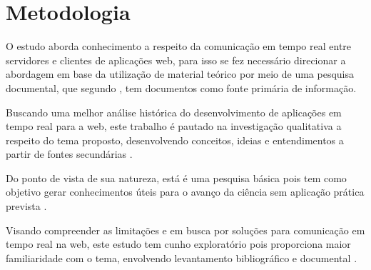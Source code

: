 \section{Metodologia}

O estudo aborda conhecimento a respeito da comunicação em tempo real entre servidores e clientes de aplicações web, para isso se fez necessário direcionar a abordagem em base da utilização de material teórico por meio de uma pesquisa documental, que segundo \cite{Marconi2003}, tem documentos como fonte primária de informação.

Buscando uma melhor análise histórica do desenvolvimento de aplicações em tempo real para a web, este trabalho é pautado na investigação qualitativa a respeito do tema proposto, desenvolvendo conceitos, ideias e entendimentos a partir de fontes secundárias \cite{prodanov2013metodologia}.

Do ponto de vista de sua natureza, está é uma pesquisa básica pois tem como objetivo gerar conhecimentos úteis para o avanço da ciência sem aplicação prática prevista \cite{prodanov2013metodologia}.

Visando compreender as limitações e em busca por soluções para comunicação em tempo real na web, este estudo tem cunho exploratório pois proporciona maior familiaridade com o tema, envolvendo levantamento bibliográfico e documental \cite{gil2002elaborar}.